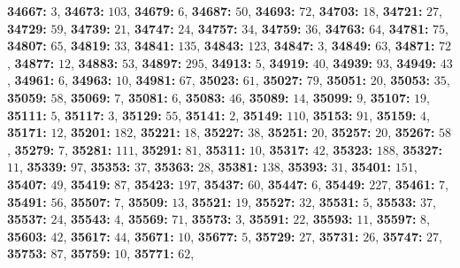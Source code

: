 \textsf{\bfseries 34667:} $3$, \textsf{\bfseries 34673:} $103$, \textsf{\bfseries 34679:} $6$, \textsf{\bfseries 34687:} $50$, \textsf{\bfseries 34693:} $72$, \textsf{\bfseries 34703:} $18$, \textsf{\bfseries 34721:} $27$, \textsf{\bfseries 34729:} $59$, \textsf{\bfseries 34739:} $21$, \textsf{\bfseries 34747:} $24$, \textsf{\bfseries 34757:} $34$, \textsf{\bfseries 34759:} $36$, \textsf{\bfseries 34763:} $64$, \textsf{\bfseries 34781:} $75$, \textsf{\bfseries 34807:} $65$, \textsf{\bfseries 34819:} $33$, \textsf{\bfseries 34841:} $135$, \textsf{\bfseries 34843:} $123$, \textsf{\bfseries 34847:} $3$, \textsf{\bfseries 34849:} $63$, \textsf{\bfseries 34871:} $72$, \textsf{\bfseries 34877:} $12$, \textsf{\bfseries 34883:} $53$, \textsf{\bfseries 34897:} $295$, \textsf{\bfseries 34913:} $5$, \textsf{\bfseries 34919:} $40$, \textsf{\bfseries 34939:} $93$, \textsf{\bfseries 34949:} $43$, \textsf{\bfseries 34961:} $6$, \textsf{\bfseries 34963:} $10$, \textsf{\bfseries 34981:} $67$, \textsf{\bfseries 35023:} $61$, \textsf{\bfseries 35027:} $79$, \textsf{\bfseries 35051:} $20$, \textsf{\bfseries 35053:} $35$, \textsf{\bfseries 35059:} $58$, \textsf{\bfseries 35069:} $7$, \textsf{\bfseries 35081:} $6$, \textsf{\bfseries 35083:} $46$, \textsf{\bfseries 35089:} $14$, \textsf{\bfseries 35099:} $9$, \textsf{\bfseries 35107:} $19$, \textsf{\bfseries 35111:} $5$, \textsf{\bfseries 35117:} $3$, \textsf{\bfseries 35129:} $55$, \textsf{\bfseries 35141:} $2$, \textsf{\bfseries 35149:} $110$, \textsf{\bfseries 35153:} $91$, \textsf{\bfseries 35159:} $4$, \textsf{\bfseries 35171:} $12$, \textsf{\bfseries 35201:} $182$, \textsf{\bfseries 35221:} $18$, \textsf{\bfseries 35227:} $38$, \textsf{\bfseries 35251:} $20$, \textsf{\bfseries 35257:} $20$, \textsf{\bfseries 35267:} $58$, \textsf{\bfseries 35279:} $7$, \textsf{\bfseries 35281:} $111$, \textsf{\bfseries 35291:} $81$, \textsf{\bfseries 35311:} $10$, \textsf{\bfseries 35317:} $42$, \textsf{\bfseries 35323:} $188$, \textsf{\bfseries 35327:} $11$, \textsf{\bfseries 35339:} $97$, \textsf{\bfseries 35353:} $37$, \textsf{\bfseries 35363:} $28$, \textsf{\bfseries 35381:} $138$, \textsf{\bfseries 35393:} $31$, \textsf{\bfseries 35401:} $151$, \textsf{\bfseries 35407:} $49$, \textsf{\bfseries 35419:} $87$, \textsf{\bfseries 35423:} $197$, \textsf{\bfseries 35437:} $60$, \textsf{\bfseries 35447:} $6$, \textsf{\bfseries 35449:} $227$, \textsf{\bfseries 35461:} $7$, \textsf{\bfseries 35491:} $56$, \textsf{\bfseries 35507:} $7$, \textsf{\bfseries 35509:} $13$, \textsf{\bfseries 35521:} $19$, \textsf{\bfseries 35527:} $32$, \textsf{\bfseries 35531:} $5$, \textsf{\bfseries 35533:} $37$, \textsf{\bfseries 35537:} $24$, \textsf{\bfseries 35543:} $4$, \textsf{\bfseries 35569:} $71$, \textsf{\bfseries 35573:} $3$, \textsf{\bfseries 35591:} $22$, \textsf{\bfseries 35593:} $11$, \textsf{\bfseries 35597:} $8$, \textsf{\bfseries 35603:} $42$, \textsf{\bfseries 35617:} $44$, \textsf{\bfseries 35671:} $10$, \textsf{\bfseries 35677:} $5$, \textsf{\bfseries 35729:} $27$, \textsf{\bfseries 35731:} $26$, \textsf{\bfseries 35747:} $27$, \textsf{\bfseries 35753:} $87$, \textsf{\bfseries 35759:} $10$, \textsf{\bfseries 35771:} $62$, 

